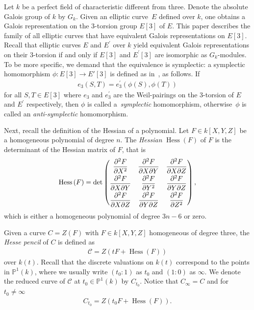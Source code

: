 \documentclass[11pt]{article}
\newcommand{\mpp}{{\mathbb{P}}}
\newcommand{\msetp}[1]{{\left({#1}\right)}}					%
\newcommand{\msets}[1]{{\left[{#1}\right]}}					%
\newcommand{\mhess}[1]{\operatorname{Hess}\msetp{#1}}			%
\newcommand{\mps}[2]{{\mpp^{#1}\msetp{#2}}}						%
\numberwithin{equation}{section}
\begin{document}
Let $k$ be a perfect field of characteristic different from three. Denote the absolute Galois group of $k$ by $G_k$. Given an elliptic curve~$E$ defined over $k$, one obtains a Galois representation on the 3-torsion group $E \msets{3}$ of $E$. This paper describes the family of all elliptic curves that have equivalent Galois representations on $E\msets{3}$. Recall that elliptic curves $E$ and $E^\prime$ over $k$ yield equivalent Galois representations on their 3-torsion if and only if $E\msets{3}$ and $E^\prime\msets{3}$ are isomorphic as $G_k$-modules. To be more specific, we demand that the equivalence is symplectic: a symplectic homomorphism $\phi\colon E[3]\to E'[3]$ is defined as in~\cite{kuwata2012}, as follows. If
\begin{gather*}
e_3\msetp{S,T}=e^\prime_3\msetp{\phi\msetp{S},\phi\msetp{T}}
\end{gather*}
for all $S,T\in E\msets{3}$ where $e_3$ and $e^\prime_3$ are the Weil-pairings on the 3-torsion of $E$ and $E^\prime$ respectively, then $\phi$ is called a~\emph{symplectic} homomorphism, otherwise~$\phi$ is called an \emph{anti-symplectic} homomorphism.

Next, recall the definition of the Hessian of a polynomial. Let $F\in k\msets {X,Y,Z}$ be a homogeneous polynomial of degree $n$. The \emph{Hessian} $\mhess{F}$ of $F$ is the determinant of the Hessian matrix of $F$, that is
\begin{gather*}
\mhess{F}=\det
\begin{pmatrix}
\dfrac{\partial^2 F}{\partial X^2} & \dfrac{\partial^2 F}{\partial X \partial Y} & \dfrac{\partial^2 F}{\partial X \partial Z} \vspace{1mm}\\
\dfrac{\partial^2 F}{\partial X \partial Y} & \dfrac{\partial^2 F}{\partial Y^2} & \dfrac{\partial^2 F}{\partial Y \partial Z} \vspace{1mm}\\
\dfrac{\partial^2 F}{\partial X \partial Z} & \dfrac{\partial^2 F}{\partial Y \partial Z} & \dfrac{\partial^2 F}{\partial Z^2}
\end{pmatrix},
\end{gather*}
which is either a homogeneous polynomial of degree $3n-6$ or zero.

Given a curve $C=Z\msetp{F}$ with $F\in k\msets{X,Y,Z}$ homogeneous of degree three, the \emph{Hesse pencil} of $C$ is defined as
\begin{gather*}
\mathcal{C}=Z\msetp{tF+\mhess{F}}
\end{gather*}
over $k\msetp{t}$. Recall that the discrete valuations on $k\msetp{t}$ correspond to the points in $\mps{1}{k}$, where we usually write $\msetp{t_0:1}$ as $t_0$ and $\msetp{1:0}$ as $\infty$. We denote the reduced curve of $\mathcal {C}$ at $t_0\in\mps{1}{k}$ by $C_{t_0}$. Notice that $C_\infty=C$ and for $t_0 \neq\infty$
\begin{gather*}
C_{t_0}=Z\msetp{t_0F+\mhess{F}}.
\end{gather*}
\end{document}
